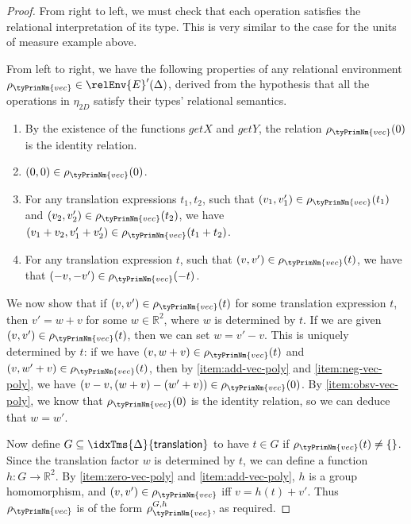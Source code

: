\begin{proof}
  From right to left, we must check that each operation satisfies the
  relational interpretation of its type. This is very similar to the
  case for the units of measure example above.

  From left to right, we have the following properties of any
  relational environment $\rho_{\tyPrimNm{vec}} \in
  \relEnv{E}'(\Delta)$, derived from the hypothesis that all the
  operations in $\eta_{\mathit{2D}}$ satisfy their types'
  relational semantics.
  \begin{enumerate}
  \item\label{item:obsv-vec-poly} By the existence of the functions
    $\mathit{getX}$ and $\mathit{getY}$, the relation
    $\rho_{\tyPrimNm{vec}}(0)$ is the identity relation.
  \item \label{item:zero-vec-poly} $(0,0) \in \rho_{\tyPrimNm{vec}}(0)$.
  \item \label{item:add-vec-poly} For any translation expressions $t_1,t_2$,
    such that $(v_1,v'_1) \in \rho_{\tyPrimNm{vec}}(t_1)$ and
    $(v_2,v'_2) \in \rho_{\tyPrimNm{vec}}(t_2)$, we have $(v_1 + v_2,
    v'_1 + v'_2) \in \rho_{\tyPrimNm{vec}}(t_1 + t_2)$.
  \item\label{item:neg-vec-poly} For any translation expression $t$,
    such that $(v,v') \in \rho_{\tyPrimNm{vec}}(t)$, we have that
    $(-v,-v') \in \rho_{\tyPrimNm{vec}}(-t)$.
  \end{enumerate}
  We now show that if $(v,v') \in \rho_{\tyPrimNm{vec}}(t)$ for some
  translation expression $t$, then $v' = w + v$ for some $w \in
  \mathbb{R}^2$, where $w$ is determined by $t$. If we are given
  $(v,v') \in \rho_{\tyPrimNm{vec}}(t)$, then we can set $w = v' -
  v$. This is uniquely determined by $t$: if we have $(v, w + v) \in
  \rho_{\tyPrimNm{vec}}(t)$ and $(v, w' + v) \in
  \rho_{\tyPrimNm{vec}}(t)$, then by \ref{item:add-vec-poly} and
  \ref{item:neg-vec-poly}, we have $(v - v, (w + v) - (w' + v)) \in
  \rho_{\tyPrimNm{vec}}(0)$. By \ref{item:obsv-vec-poly}, we know that
  $\rho_{\tyPrimNm{vec}}(0)$ is the identity relation, so we can
  deduce that $w = w'$.

  Now define $G \subseteq \idxTms{\Delta}{\mathsf{translation}}$ to
  have $t \in G$ if $\rho_{\tyPrimNm{vec}}(t) \not= \{\}$. Since the
  translation factor $w$ is determined by $t$, we can define a
  function $h : G \to \mathbb{R}^2$. By \ref{item:zero-vec-poly} and
  \ref{item:add-vec-poly}, $h$ is a group homomorphism, and $(v,v')
  \in \rho_{\tyPrimNm{vec}}$ iff $v = h(t) + v'$. Thus
  $\rho_{\tyPrimNm{vec}}$ is of the form
  $\rho^{G,h}_{\tyPrimNm{vec}}$, as required.
\end{proof}


